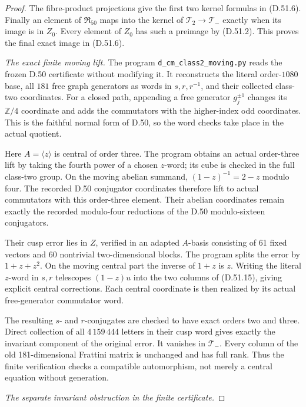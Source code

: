 \begin{proof}
The fibre-product projections give the first
two kernel formulas in (D.51.6). Finally an
element of \(\mathfrak R_{50}\) maps into
the kernel of \(\mathcal T_2\to\mathcal T_-\)
exactly when its image is in \(Z_0\).
Every element of \(Z_0\) has such a preimage
by (D.51.2). This proves the final exact
image in (D.51.6).

\emph{The exact finite moving lift.}
The program \texttt{d\_cm\_class2\_moving.py}
reads the frozen D.50 certificate without
modifying it. It reconstructs the literal
order-\(1080\) base, all \(181\) free graph
generators as words in \(s,r,r^{-1}\), and
their collected class-two coordinates.
For a closed path, appending a free generator
\(g_j^{\pm1}\) changes its \(\mathbb Z/4\)
coordinate and adds the commutators with
the higher-index odd coordinates. This is
the faithful normal form of D.50, so the
word checks take place in the actual quotient.

Here \(A=\langle z\rangle\) is central of
order three. The program obtains an actual
order-three lift by taking the fourth power
of a chosen \(z\)-word; its cube is checked
in the full class-two group. On the moving
abelian summand, \((1-z)^{-1}=2-z\) modulo
four. The recorded D.50 conjugator coordinates
therefore lift to actual commutators with
this order-three element. Their abelian
coordinates remain exactly the recorded
modulo-four reductions of the D.50
modulo-sixteen conjugators.

Their cusp error lies in \(Z\), verified
in an adapted \(A\)-basis consisting of
61 fixed vectors and 60 nontrivial
two-dimensional blocks. The program splits
the error by \(1+z+z^2\). On the moving
central part the inverse of \(1+z\) is \(z\).
Writing the literal \(z\)-word in \(s,r\)
telescopes \((1-z)u\) into the two columns
of (D.51.15), giving explicit central
corrections. Each central coordinate is
then realized by its actual free-generator
commutator word.

The resulting \(s\)- and \(r\)-conjugates
are checked to have exact orders two and
three. Direct collection of all
\(4\,159\,444\) letters in their cusp word
gives exactly the invariant component of
the original error. It vanishes in
\(\mathcal T_-\). Every column of the old
181-dimensional Frattini matrix is unchanged
and has full rank. Thus the finite verification
checks a compatible automorphism, not merely
a central equation without generation.

\emph{The separate invariant obstruction in the finite certificate.}


\end{proof}
